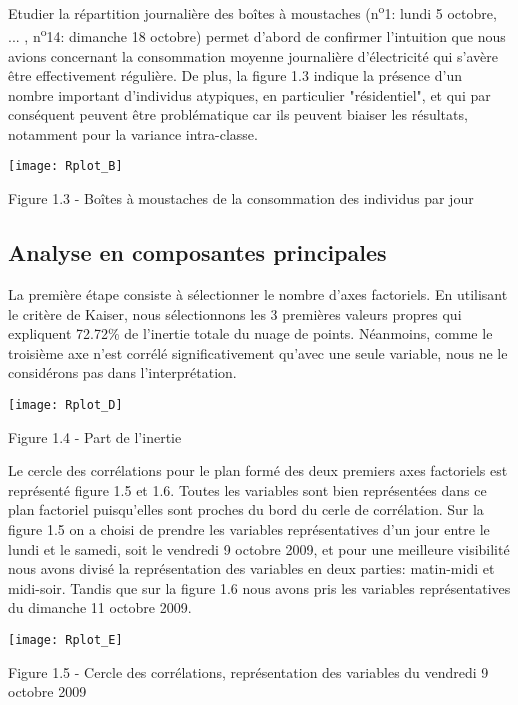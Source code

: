 \documentclass[11pt,fleqn]{book} %
\begin{document}
\newpage 
 
Etudier la répartition journalière des boîtes à moustaches (n\textsuperscript{o}1: lundi 5 octobre, ... , n\textsuperscript{o}14: dimanche 18 octobre) permet d'abord de confirmer l'intuition que nous avions concernant la consommation moyenne journalière d'électricité qui s'avère être effectivement régulière. De plus, la figure 1.3 indique la présence d'un nombre important d'individus atypiques, en particulier "résidentiel", et qui par conséquent peuvent être problématique
car ils peuvent biaiser les résultats, notamment pour la variance intra-classe.

\texttt{[image: Rplot\_B]}
 \begin{center} Figure 1.3 - Boîtes à moustaches de la consommation des individus par jour \end{center}

\subsection{Analyse en composantes principales}

La première étape consiste à sélectionner le nombre d’axes factoriels. En utilisant le critère de Kaiser, nous sélectionnons les 3 premières valeurs propres qui expliquent 72.72\% de l’inertie totale du nuage de points. Néanmoins, comme le troisième axe n’est corrélé significativement qu’avec une seule variable, nous ne le considérons pas dans l’interprétation.


\texttt{[image: Rplot\_D]}
 \begin{center} Figure 1.4 - Part de l'inertie  \end{center}
 
Le cercle des corrélations pour le plan formé des deux premiers axes factoriels est représenté figure 1.5 et 1.6. Toutes les  variables sont bien représentées dans ce plan factoriel puisqu'elles sont proches du bord du cerle de corrélation. Sur la figure 1.5 on a choisi de prendre les variables représentatives d'un jour entre le lundi et le samedi, soit le vendredi 9 octobre 2009, et pour une meilleure visibilité nous avons divisé la représentation des variables en deux parties: matin-midi et midi-soir. Tandis que sur la figure 1.6 nous avons pris les variables représentatives du dimanche 11 octobre 2009.  

\texttt{[image: Rplot\_E]}
 \begin{center} Figure 1.5 - Cercle des corrélations, représentation des variables du vendredi 9 octobre 2009 \end{center}
 
\end{document}
